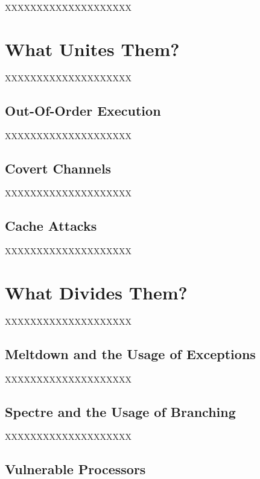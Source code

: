 \documentclass[a4paper,oneside,openright] {scrreprt}
\begin{document}
XXXXXXXXXXXXXXXXXXXX

\section{What Unites Them?}
\label{ch:intro:motivation}

XXXXXXXXXXXXXXXXXXXX

\subsection{Out-Of-Order Execution}
\label{ch:intro:motivation:A}

XXXXXXXXXXXXXXXXXXXX

\subsection{Covert Channels}
\label{ch:intro:motivation:A}

XXXXXXXXXXXXXXXXXXXX

\subsection{Cache Attacks}
\label{ch:intro:motivation:A}

XXXXXXXXXXXXXXXXXXXX

\section{What Divides Them?}
\label{ch:intro:motivation}

XXXXXXXXXXXXXXXXXXXX

\subsection{Meltdown and the Usage of Exceptions}
\label{ch:intro:motivation:A}

XXXXXXXXXXXXXXXXXXXX

\subsection{Spectre and the Usage of Branching}
\label{ch:intro:motivation:A}

XXXXXXXXXXXXXXXXXXXX

\subsection{Vulnerable Processors}
\label{ch:intro:motivation:A}
\end{document}

